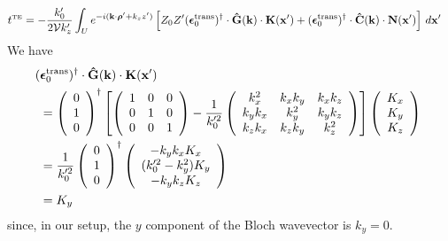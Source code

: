 \documentclass[letterpaper]{article}
\newcommand{\vbEps}{\boldsymbol{\epsilon}}
\begin{document}
\begin{align*}
 t\supt{TE}
&=-\frac{k_0^\prime}{2 \mc V k_z^\prime}
   \int_U e^{-i(\vb k \cdot \vbrho^\prime + k_z z^\prime)}
        \left[ Z_0 Z^\prime 
               (\vbEps_0\sups{trans})^\dagger \cdot 
               \vbhat{G}(\vb k) \cdot \vb K(\vb x^\prime)
               +(\vbEps_0\sups{trans})^\dagger \cdot 
               \vbhat{C}(\vb k)\cdot \vb N(\vb x^\prime) 
        \right] \, d\vb x^\prime
\end{align*}
We have 
\begin{align*}
&\hspace{-0.05in}
 (\vbEps_0\sups{trans})^\dagger \cdot
 \vbhat{G}(\vb k) \cdot \vb K(\vb x^\prime)
\\
&=
 \left(\begin{array}{c}0 \\ 1 \\ 0\end{array}\right)^\dagger
 \left[ \left(\begin{array}{ccc}
               1 & 0 & 0 \\ 
               0 & 1 & 0 \\ 
               0 & 0 & 1
              \end{array}\right)
       -\frac{1}{k_0^{\prime 2}}
        \left(\begin{array}{ccc}
               k_x^2   & k_x k_y & k_x k_z \\
               k_yk_x  & k_y^2   & k_y k_z \\
               k_z k_x & k_z k_y & k_z^2
              \end{array}
        \right)
 \right]
 \left(\begin{array}{c}K_x \\ K_y \\ K_z\end{array}\right)
\\
&=
 \frac{1}{k_0^{\prime 2}}
 \left(\begin{array}{c}0 \\ 1 \\ 0\end{array}\right)^\dagger
 \left(\begin{array}{c} -k_y k_x K_x \\ (k_0^{\prime 2}-k_y^2)K_y \\ -k_y k_z K_z
       \end{array}\right)
\\
&= K_y
\end{align*}
since, in our setup, the $y$ component of the Bloch 
wavevector is $k_y=0.$
\end{document}
